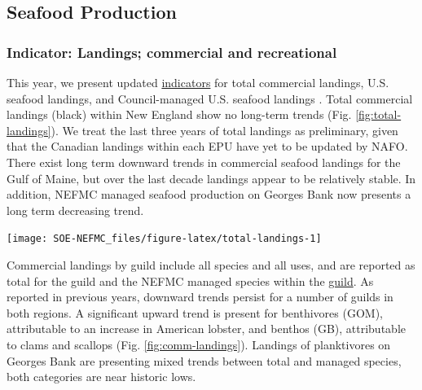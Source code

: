 \documentclass[
  10pt,
]{article}
\let\origfigure\figure
\let\endorigfigure\endfigure
\renewenvironment{figure}[1][2] {
    \expandafter\origfigure\expandafter[H]
} {
    \endorigfigure
}
\begin{document}
\hypertarget{seafood-production}{%
\subsection{Seafood Production}\label{seafood-production}}

\hypertarget{indicator-landings-commercial-and-recreational}{%
\subsubsection{Indicator: Landings; commercial and recreational}\label{indicator-landings-commercial-and-recreational}}

This year, we present updated \href{https://noaa-edab.github.io/catalog/commercial-landings-and-revenue.html}{indicators} for total commercial landings, U.S. seafood landings, and Council-managed U.S. seafood landings . Total commercial landings (black) within New England show no long-term trends (Fig. \ref{fig:total-landings}). We treat the last three years of total landings as preliminary, given that the Canadian landings within each EPU have yet to be updated by NAFO. There exist long term downward trends in commercial seafood landings for the Gulf of Maine, but over the last decade landings appear to be relatively stable. In addition, NEFMC managed seafood production on Georges Bank now presents a long term decreasing trend.

\begin{figure}

{\centering \texttt{[image: SOE-NEFMC\_files/figure-latex/total-landings-1]} 

}

\caption{Total commercial landings (black), total U.S. seafood landings (blue), and New England managed U.S. seafood landings (red) for Georges Bank and the Gulf of Maine. Open circles represent years that are lacking NAFO (foreign) data. mt = metric tons}\label{fig:total-landings}
\end{figure}

Commercial landings by guild include all species and all uses, and are reported as total for the guild and the NEFMC managed species within the \href{https://noaa-edab.github.io/catalog/feeding-guilds-by-management-bodies.html}{guild}. As reported in previous years, downward trends persist for a number of guilds in both regions. A significant upward trend is present for benthivores (GOM), attributable to an increase in American lobster, and benthos (GB), attributable to clams and scallops (Fig. \ref{fig:comm-landings}). Landings of planktivores on Georges Bank are presenting mixed trends between total and managed species, both categories are near historic lows.
\end{document}
